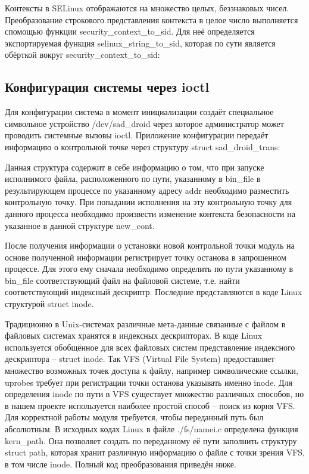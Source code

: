 Контексты в SELinux отображаются на множество целых, беззнаковых чисел.
Преобразование строкового представления контекста в целое число
выполняется спомощью функции security\_context\_to\_sid. Для неё
определяется экспортируемая функция selinux\_string\_to\_sid, которая по
сути является обёрткой вокруг security\_context\_to\_sid:


\subsection{Конфигурация системы через ioctl}

Для конфигурации система в момент инициализации создаёт специальное
символьное устройство /dev/sad\_droid через которое администратор может
проводить системные вызовы ioctl. Приложение конфигурации передаёт
информацию о контрольной точке через структуру struct sad\_droid\_trans:


\bigskip

Данная структура содержит в себе информацию о том, что при запуске
исполнимого файла, расположенного по пути, указанному в bin\_file в
результирующем процессе по указанному адресу addr необходимо разместить
контрольную точку. При попадании исполнения на эту контрольную точку для
данного процесса необходимо произвести изменение контекста безопасности
на указанное в данной структуре new\_cont.

После получения информации о установки новой контрольной точки модуль на
основе полученной информации регистрирует точку останова в запрошенном
процессе. Для этого ему сначала необходимо определить по пути указанному
в bin\_file соответствующий файл на файловой системе, т.е. найти
соответствующий индексный дескриптр. Последние представляются в коде
Linux структурой struct inode. 

Традиционно в Unix-системах различные мета-данные связанные с файлом в
файловых системах хранятся в индексных дескрипторах. В коде Linux
используется обобщённое для всех файловых систем представление
индексного дескриптора -- struct inode. Так VFS (Virtual File System)
предоставляет множество возможных точек доступа к файлу, например
символические ссылки, uprobes требует при регистрации точки останова
указывать именно inode. Для определения inode по пути в VFS существует
множество различных способов, но в нашем проекте используется наиболее
простой способ -- поиск из корня VFS. Для корректной работы модуля
требуется, чтобы переданный путь был абсолютным. В исходных кодах Linux
в файле ./fs/namei.c определена функция kern\_path. Она позволяет
создать по переданному её пути заполнить структуру struct path, которая
хранит различную информацию о файле с точки зрения VFS, в том числе
inode. Полный код преобразования приведён ниже.


